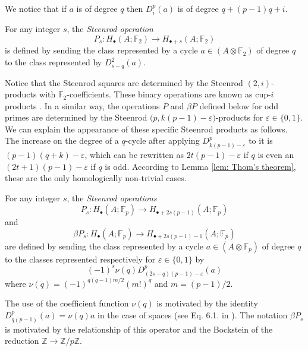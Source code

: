 We notice that if $a$ is of degree $q$ then $D^p_i(a)$ is of degree $q + (p-1)q + i$.

\begin{definition}
	For any integer $s$, the \textit{Steenrod operation}
	\begin{equation*}
	P_s \colon H_\bullet(A; \mathbb{F}_2) \to H_{\bullet + s}(A; \mathbb{F}_2)
	\end{equation*}
	is defined by sending the class represented by a cycle $a \in (A \otimes \mathbb{F}_2)$ of degree $q$ to the class represented by $D^2_{s-q}(a)$.
\end{definition}

Notice that the Steenrod squares are determined by the Steenrod $(2,i)$-products with $\mathbb{F}_2$-coefficients.
These binary operations are known as cup-$i$ products \cite{steenrod47products, medina2021newformulas}.
In a similar way, the operations $P$ and $\beta P$ defined below for odd primes are determined by the Steenrod $\big(p, k(p-1)-\varepsilon\big)$-products for $\varepsilon \in \{0,1\}$.
We can explain the appearance of these specific Steenrod products as follows.
The increase on the degree of a $q$-cycle after applying $D^p_{k(p-1)-\varepsilon}$ to it is $(p-1)(q+k) - \varepsilon$, which can be rewritten as $2t(p-1) - \varepsilon$ if $q$ is even an $(2t+1)(p-1) - \varepsilon$ if $q$ is odd.
According to Lemma \ref{lem: Thom's theorem}, these are the only homologically non-trivial cases.

\begin{definition} \label{def: Steenrod operations at odd prime}
	For any integer $s$, the \textit{Steenrod operations}
	\begin{equation*}
	P_s \colon H_\bullet(A; \mathbb{F}_p) \to H_{\bullet + 2s(p-1)}(A; \mathbb{F}_p)
	\end{equation*}
	and
	\begin{equation*}
	\beta P_s \colon H_\bullet(A; \mathbb{F}_p) \to H_{\bullet + 2s(p-1) - 1}(A; \mathbb{F}_p)
	\end{equation*}
	are defined by sending the class represented by a cycle $a \in (A \otimes \mathbb{F}_p)$ of degree $q$ to the classes represented respectively for $\varepsilon \in\{0,1\}$ by
	\begin{equation*}
	(-1)^s \nu(q) D^p_{(2s-q)(p-1)-\varepsilon}(a)
	\end{equation*}
	where $\nu(q) = (-1)^{q(q-1)m/2}(m!)^q$ and $m = (p-1)/2$.
\end{definition}

\begin{remark}
	The use of the coefficient function $\nu(q)$ is motivated by the identity $D_{q(p-1)}^p(a) = \nu(q)a$ in the case of spaces (see Eq. 6.1. in \cite{steenrod53cyclic}).
	The notation $\beta P_s$ is motivated by the relationship of this operator and the Bockstein of the reduction $\mathbb Z \to \mathbb Z/p\mathbb Z$.
\end{remark}


